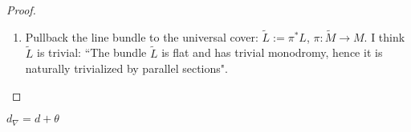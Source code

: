 \begin{proof}\leavevmode
\begin{enumerate}[label=\textbf{Step \arabic*}]
\item Pullback the line bundle to the universal cover: \(\tilde{L}:= \pi^*L\), \(\pi:\tilde{M} \to M\). I think \(\tilde{L}\) is trivial: ``The bundle \(\tilde{L}\) is flat and has trivial monodromy, hence it is naturally trivialized by parallel sections".
\end{enumerate}
\end{proof}

\begin{remark}\leavevmode
	\(d_\nabla=d+\theta\)
\end{remark}



